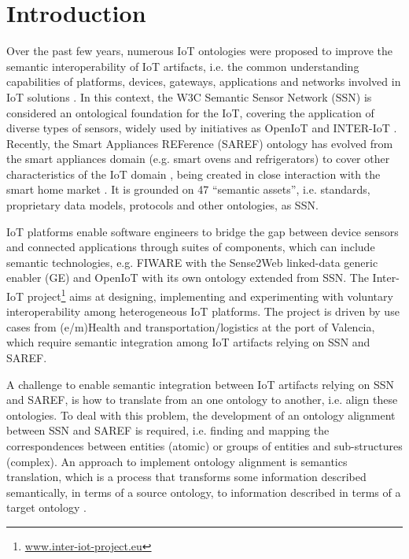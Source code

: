 \documentclass{sig-alternate-05-2015}
\begin{document}
\section{Introduction}

Over the past few years, numerous IoT ontologies were proposed to improve the semantic interoperability of IoT artifacts, i.e. the common understanding capabilities of platforms, devices, gateways, applications and networks involved in IoT solutions \cite{Ganzha2016a}. In this context, the W3C Semantic Sensor Network (SSN) is considered an ontological foundation for the IoT, covering the application of diverse types of sensors, widely used by initiatives as OpenIoT \cite{Soldatos2015} and INTER-IoT \cite{Ganzha2017a}. 
Recently, the Smart Appliances REFerence (SAREF) ontology has evolved from the smart appliances domain (e.g. smart ovens and refrigerators) \cite{Daniele2015} to cover other characteristics of the IoT domain \cite{Daniele2016b}, being created in close interaction with the smart home market \cite{Daniele2016}. It is grounded on 47 “semantic assets”, i.e. standards, proprietary data models, protocols and other ontologies, as SSN. 

IoT platforms enable software engineers to bridge the gap between device sensors and connected applications through suites of components, which can include semantic technologies, e.g. FIWARE with the Sense2Web linked-data generic enabler (GE) and OpenIoT with its own ontology extended from SSN. The Inter-IoT project\footnote{\url{www.inter-iot-project.eu}} aims at designing, implementing and experimenting with voluntary interoperability among heterogeneous IoT platforms. The project is driven by use cases from (e/m)Health and transportation/logistics at the port of Valencia, which require semantic integration among IoT artifacts relying on SSN and SAREF.  

A challenge to enable semantic integration between IoT artifacts relying on SSN and SAREF, is how to translate from an one ontology to another, i.e. align these ontologies. To deal with this problem, the development of an ontology alignment between SSN and SAREF is required, i.e. finding and mapping the correspondences between entities (atomic) or groups of entities and sub-structures (complex). An approach to implement ontology alignment is semantics translation, which is a process that transforms some information described semantically, in terms of a source ontology, to information described in terms of a target ontology \cite{Ganzha2015}. 
\end{document}
